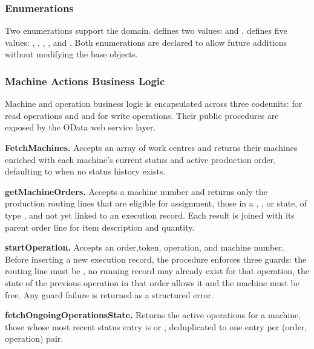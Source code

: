 \subsubsection*{Enumerations}

Two enumerations support the domain.
  defines two values:
 and .
  defines five values:
, , ,
, and .
Both enumerations are declared  to allow future
additions without modifying the base objects.


\subsubsection*{Machine Actions Business Logic}
Machine and operation business logic is encapsulated across three codeunits:
 for read operations and
 and  for write 
operations. Their public procedures are exposed by the OData web service layer.

\textbf{FetchMachines.}
Accepts an array of work centres and returns their machines enriched with each
machine's current status and active production order, defaulting to
 when no status history exists.

\textbf{getMachineOrders.}
Accepts a machine number and returns only the production routing lines that are
eligible for assignment, those in a ,
, or  state, of type
, and not yet linked to an execution record.
Each result is joined with its parent order line for item description and quantity.

\textbf{startOperation.}
Accepts an order,token, operation, and machine number. Before inserting a new
 execution record, the procedure enforces three guards: the
routing line must be , no running record may already exist
for that operation, the state of the previous operation in that order allows it
and the machine must be free. Any guard failure is returned as a structured  error.

\textbf{fetchOngoingOperationsState.}
Returns the active operations for a machine, those whose most recent status
entry is  or , deduplicated to one
entry per (order, operation) pair.

